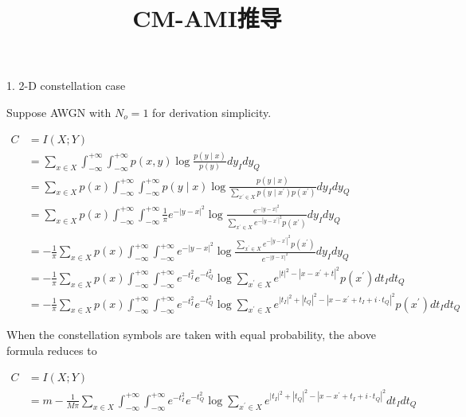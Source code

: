 \documentclass[12pt,a4paper]{article}
\title{CM-AMI推导}
\author{}
\date{}
\begin{document}
\setlength{\baselineskip}{20pt}
\maketitle
\thispagestyle{fancy}

1. 2-D constellation case

Suppose AWGN with $N_o=1$ for derivation simplicity.

\begin{equation}
    \begin{split}
        C&=I(X;Y)\\
        &=\sum_{x\in X}\int_{-\infty}^{+\infty}\int_{-\infty}^{+\infty}p(x,y)\log\frac{p(y\mid x)}{p(y)}dy_{I}dy_{Q}\\
        &=\sum_{x\in X}p(x)\int_{-\infty}^{+\infty}\int_{-\infty}^{+\infty}p(y\mid x)\log\frac{p(y\mid x)}{\sum_{x^\prime\in X}p(y\mid x^\prime)p(x^\prime)}dy_{I}dy_{Q}\\
        &=\sum_{x\in X}p(x)\int_{-\infty}^{+\infty}\int_{-\infty}^{+\infty}\frac{1}{\pi}e^{-|y-x|^2}\log\frac{e^{-|y-x|^2}}{\sum_{x^\prime\in X}e^{-|y-x^\prime|^2}p(x^\prime)}dy_{I}dy_{Q}\\
        &=-\frac{1}{\pi}\sum_{x\in X}p(x)\int_{-\infty}^{+\infty}\int_{-\infty}^{+\infty}e^{-|y-x|^2}\log\frac{\sum_{x^\prime\in X}e^{-|y-x^\prime|^2}p(x^\prime)}{e^{-|y-x|^2}}dy_{I}dy_{Q}\\
        &=-\frac{1}{\pi}\sum_{x\in X}p(x)\int_{-\infty}^{+\infty}\int_{-\infty}^{+\infty}e^{-t_I^2}e^{-t_Q^2}\log{\sum_{x^\prime\in X}e^{|t|^2-|x-x^\prime+t|^2}p(x^\prime)}dt_{I}dt_{Q}\\
        &=-\frac{1}{\pi}\sum_{x\in X}p(x)\int_{-\infty}^{+\infty}\int_{-\infty}^{+\infty}e^{-t_I^2}e^{-t_Q^2}\log{\sum_{x^\prime\in X}e^{|t_I|^2+|t_Q|^2-|x-x^\prime+t_I+i\cdot t_Q|^2}p(x^\prime)}dt_{I}dt_{Q}
        \end{split}\tag{1-1}
\end{equation}

When the constellation symbols are taken with equal probability, the above formula reduces to

\begin{equation}
    \begin{split}
        C&=I(X;Y)\\
        &=m-\frac{1}{M\pi}\sum_{x\in X}\int_{-\infty}^{+\infty}\int_{-\infty}^{+\infty}e^{-t_I^2}e^{-t_Q^2}\log{\sum_{x^\prime\in X}e^{|t_I|^2+|t_Q|^2-|x-x^\prime+t_I+i\cdot t_Q|^2}}dt_{I}dt_{Q}
    \end{split}\tag{1-2}
\end{equation}
\end{document}
